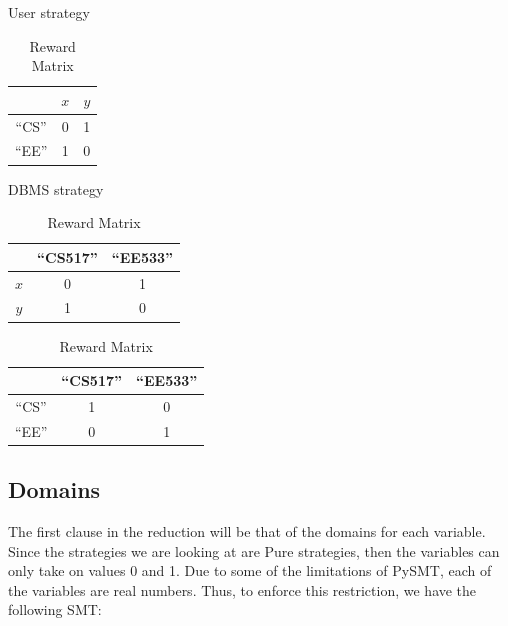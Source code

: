 \documentclass{article}
\begin{document}
\begin{table}[h!]
	\centering
    \begin{minipage}{.2\linewidth}
        \caption{User strategy}
        \centering
        \begin{tabular}{c|c|c|}
            \cline{2-3}
             & \multicolumn{1}{c|}{$x$} & $y$\\
            \hline
            \multicolumn{1}{|c|}{``CS''} & 0 & 1\\
            \hline
            \multicolumn{1}{|c|}{``EE''} & 1 & 0\\
            \hline
        \end{tabular}
        \label{example:framework:table:strategies:sender}
    \end{minipage}
    \begin{minipage}{.35\linewidth}
        \caption{DBMS strategy}
        \centering
        \begin{tabular}{c|c|c|}
            \cline{2-3}
             & \multicolumn{1}{c|}{``CS517''} & ``EE533''\\
            \hline
            \multicolumn{1}{|c|}{$x$} & 0 & 1\\
            \hline
            \multicolumn{1}{|c|}{$y$} & 1 & 0\\
            \hline
        \end{tabular}
        \label{example:framework:table:strategies:receiver}
    \end{minipage}
       \begin{minipage}{.3\linewidth}
        \caption{Reward Matrix}
        \centering
        \begin{tabular}{c|c|c|}
            \cline{2-3}
             & \multicolumn{1}{c|}{``CS517''} & ``EE533''\\
            \hline
            \multicolumn{1}{|c|}{``CS''} & 1 & 0\\
            \hline
            \multicolumn{1}{|c|}{``EE''} & 0 & 1\\
            \hline
        \end{tabular}
        \label{example:framework:table:strategies:reward}
    \end{minipage}
\end{table}

\subsection{Domains}
The first clause in the reduction will be that of the domains for each variable. Since the strategies we are looking at are Pure strategies, then the variables can only take on values 0 and 1. Due to some of the limitations of PySMT, each of the variables are real numbers. Thus, to enforce this restriction, we have the following SMT:
\end{document}
